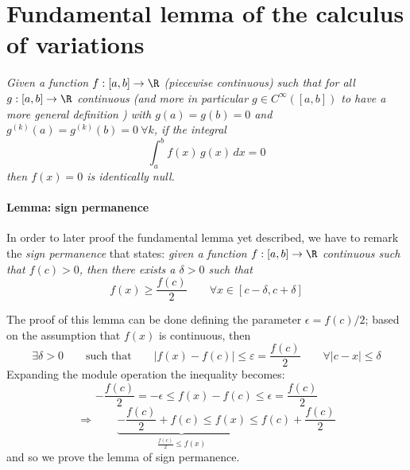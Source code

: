 \section{Fundamental lemma of the calculus of variations}
	{\itshape Given a function $f:[a,b]\rightarrow \R$ (piecewise continuous) such that for all $g:[a,b] \rightarrow \R$ continuous (and more in particular $g \in C^\infty([a,b])$ to have a more general definition ) with $g(a) = g(b) = 0$ and $g^{(k)}(a) = g^{(k)}(b) = 0 \ \forall k$, if the integral 
		\begin{equation} \label{eq:func:lemma}
			\int_a^b f(x)\,g(x) \, dx = 0
		\end{equation}
		then $f(x)= 0 $ is identically null. }
	
	\paragraph{Lemma: sign permanence} In order to later proof the fundamental lemma yet described, we have to remark the \textit{sign permanence} that states: {\itshape given a function $f:[a,b]\rightarrow \R$ continuous such that $f(c) >0$, then there exists a $\delta >0$ such that }
	\[ f(x) \geq \frac{f(c)}{2} \qquad \forall x \in [c-\delta,c+\delta] \]
	
	The proof of this lemma can be done defining the parameter $\epsilon = f(c) / 2$; based on the assumption that $f(x)$ is continuous, then
	\[ \exists \delta >0 \qquad \textrm{such that} \qquad |f(x) - f(c)| \leq \varepsilon = \frac{f(c)}{2} \qquad \forall |c-x|\leq \delta \]
	Expanding the module operation the inequality becomes:
	\[ -\frac{f(c)}{2} = - \epsilon \leq f(x)-f(c) \leq \epsilon = \frac{f(c)}{2} \]
	\[ \Rightarrow \qquad \underbrace{-\frac{f(c)}{2} + f(c) \leq f(x)}_{\frac{f(c)}{2} \leq f(x)} \leq f(c) + \frac{f(c)}{2} \]
	and so we prove the lemma of sign permanence.
	
